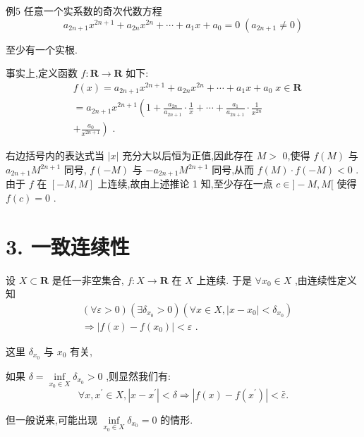例5 任意一个实系数的奇次代数方程
$${a}_{{2n} + 1}{x}^{{2n} + 1} + {a}_{2n}{x}^{2n} + \cdots  + {a}_{1}x + {a}_{0} = 0\;\left( {{a}_{{2n} + 1} \neq  0}\right)$$

至少有一个实根.

事实上,定义函数 $f : \mathbf{R} \rightarrow  \mathbf{R}$ 如下:
\begin{align*}
	&f\left( x\right)  = {a}_{{2n} + 1}{x}^{{2n} + 1} + {a}_{2n}{x}^{2n} + \cdots  + {a}_{1}x + {a}_{0}\;x \in  \mathbf{R}\\
	&= {a}_{{2n} + 1}{x}^{{2n} + 1}\left( {1 + \frac{{a}_{2n}}{{a}_{{2n} + 1}} \cdot  \frac{1}{x} + \cdots  + \frac{{a}_{1}}{{a}_{{2n} + 1}} \cdot  \frac{1}{{x}^{2n}}}\right.\\
	&\left. {+\frac{{a}_{0}}{{x}^{{2n} + 1}}}\right) \text{ . }
\end{align*}

右边括号内的表达式当 $\left| x\right|$ 充分大以后恒为正值,因此存在 $M >$ 0,使得 $f\left( M\right)$ 与 ${a}_{{2n} + 1}{M}^{{2n} + 1}$ 同号, $f\left( {-M}\right)$ 与 $- {a}_{{2n} + 1}{M}^{{2n} + 1}$ 同号,从而 $f\left( M\right)  \cdot  f\left( {-M}\right)  < 0$ . 由于 $f$ 在 $\left\lbrack  {-M,M}\right\rbrack$ 上连续,故由上述推论 1 知,至少存在一点 $c \in  \rbrack  - M,M\lbrack$ 使得 $f\left( c\right)  = 0$ .

\section*{3. 一致连续性}

设 $X \subset  \mathbf{R}$ 是任一非空集合, $f : X \rightarrow  \mathbf{R}$ 在 $X$ 上连续. 于是 $\forall {x}_{0} \in  X$ ,由连续性定义知
\begin{align*}
	&\left( {\forall \varepsilon  > 0}\right) \left( {\exists {\delta }_{{x}_{0}} > 0}\right) \left( {\forall x \in  X,\left| {x - {x}_{0}}\right|  < {\delta }_{{x}_{0}}}\right)\\
	&\Rightarrow  \left| {f\left( x\right)  - f\left( {x}_{0}\right) }\right|  < \varepsilon \text{ . }
\end{align*}

这里 ${\delta }_{{x}_{0}}$ 与 ${x}_{0}$ 有关,

如果 $\delta  = \mathop{\inf }\limits_{{{x}_{0} \in  X}}{\delta }_{{x}_{0}} > 0$ ,则显然我们有:
$$\forall x,{x}^{\prime } \in  X,\left| {x - {x}^{\prime }}\right|  < \delta  \Rightarrow  \left| {f\left( x\right)  - f\left( {x}^{\prime }\right) }\right|  < \bar{\varepsilon }.$$

但一般说来,可能出现 $\mathop{\inf }\limits_{{{x}_{0} \in  X}}{\delta }_{{x}_{0}} = 0$ 的情形.

